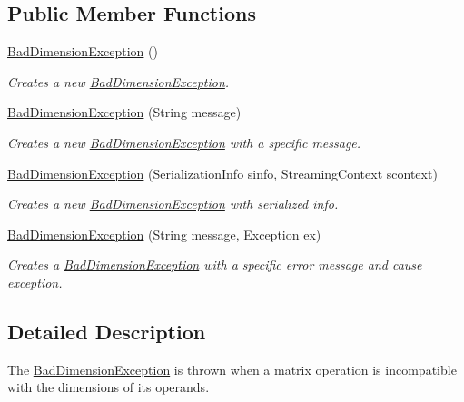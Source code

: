 \subsection*{Public Member Functions}
\begin{DoxyCompactItemize}
\item 
\mbox{\hyperlink{class_matrix_demo_1_1_r_t_w_1_1_bad_dimension_exception_a798ed5eabe99eb0da328d483fc65b872}{Bad\+Dimension\+Exception}} ()
\begin{DoxyCompactList}\small\item\em Creates a new \mbox{\hyperlink{class_matrix_demo_1_1_r_t_w_1_1_bad_dimension_exception}{Bad\+Dimension\+Exception}}. \end{DoxyCompactList}\item 
\mbox{\hyperlink{class_matrix_demo_1_1_r_t_w_1_1_bad_dimension_exception_acb08f6b3204a52bab02d4a2b2bd5018d}{Bad\+Dimension\+Exception}} (String message)
\begin{DoxyCompactList}\small\item\em Creates a new \mbox{\hyperlink{class_matrix_demo_1_1_r_t_w_1_1_bad_dimension_exception}{Bad\+Dimension\+Exception}} with a specific message. \end{DoxyCompactList}\item 
\mbox{\hyperlink{class_matrix_demo_1_1_r_t_w_1_1_bad_dimension_exception_ac8b77428bbfa83daf5d72873c5ea2cfa}{Bad\+Dimension\+Exception}} (Serialization\+Info sinfo, Streaming\+Context scontext)
\begin{DoxyCompactList}\small\item\em Creates a new \mbox{\hyperlink{class_matrix_demo_1_1_r_t_w_1_1_bad_dimension_exception}{Bad\+Dimension\+Exception}} with serialized info. \end{DoxyCompactList}\item 
\mbox{\hyperlink{class_matrix_demo_1_1_r_t_w_1_1_bad_dimension_exception_a7cbc7dfbc98f0834b5954db4e41a5c10}{Bad\+Dimension\+Exception}} (String message, Exception ex)
\begin{DoxyCompactList}\small\item\em Creates a \mbox{\hyperlink{class_matrix_demo_1_1_r_t_w_1_1_bad_dimension_exception}{Bad\+Dimension\+Exception}} with a specific error message and cause exception. \end{DoxyCompactList}\end{DoxyCompactItemize}


\subsection{Detailed Description}
The \mbox{\hyperlink{class_matrix_demo_1_1_r_t_w_1_1_bad_dimension_exception}{Bad\+Dimension\+Exception}} is thrown when a matrix operation is incompatible with the dimensions of its operands. 



